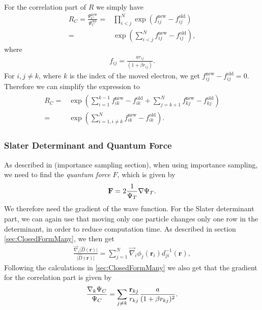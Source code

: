 \documentclass[../main.tex]{subfiles}
\begin{document}
For the correlation part of $R$ we simply have 
\begin{align}
    R_{C} = \frac{\Psi_C^{\textrm{new}}}{\Psi_C^{\textrm{old}}}
    =& \prod_{i<j}^{N} \exp\left(f_{ij}^{\textrm{new}} - f_{ij}^{\textrm{old}}\right)\\
    =& \exp\left(\sum_{i<j}^{N} f_{ij}^{\textrm{new}} - f_{ij}^{\textrm{old}}\right),
\end{align}
where 
\begin{align}
    f_{ij} = \frac{a r_{ij}}{(1+\beta r_{ij})}.
\end{align}
For $i,j \neq k$, where $k$ is the index of the moved electron, we get $f_{ij}^{\textrm{new}} - f_{ij}^{\textrm{old}} = 0$. Therefore we can simplify the expression to 
\begin{align}\label{eq:MetropolisRatioC}
\begin{split}
    R_{C} =& \exp\left(\sum_{i=1}^{k-1} f_{ik}^{\textrm{new}} - f_{ik}^{\textrm{old}} + \sum_{j=k+1}^{N} f_{kj}^{\textrm{new}} - f_{kj}^{\textrm{old}}\right)\\
    =& \exp\left(\sum_{i=1, i\neq k}^{N} f_{ik}^{\textrm{new}} - f_{ik}^{\textrm{old}}\right).
\end{split}
\end{align}

\subsubsection{Slater Determinant and Quantum Force}
As described in (importance sampling section), when using importance sampling, we need to find the \textit{quantum force} $F$, which is given by
\begin{align}
    {\bf F} = 2 \frac{1}{\Psi_T} \nabla \Psi_T.
\end{align}
We therefore need the gradient of the wave function. For the Slater determinant part, we can again use that moving only one particle changes only one row in the determinant, in order to reduce computation time. As described in section \ref{sec:ClosedFormMany}, we then get
\begin{align}
    \frac{\vec\nabla_i\vert\hat{D}(\mathbf{r})\vert}{\vert\hat{D}(\mathbf{r})\vert} =
    \sum_{j=1}^N \vec\nabla_i \phi_j(\mathbf{r}_i)d_{ji}^{-1}(\mathbf{r}),
\end{align}
Following the calculations in \ref{sec:ClosedFormMany} we also get that the gradient for the correlation part is given by 
\begin{align}
    \frac{ \nabla_k \Psi_C}{ \Psi_C } = \sum_{j\ne k}\frac{{\bf r}_{kj}}{r_{kj}}\frac{a}{(1+\beta r_{kj})^2}.
\end{align}
\end{document}

